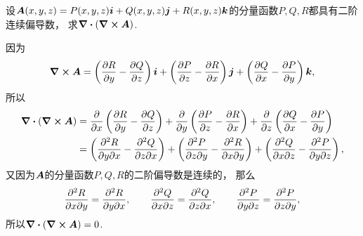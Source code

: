 \begin{example}
设\(\boldsymbol{A}(x,y,z) = P(x,y,z) \boldsymbol{i} + Q(x,y,z) \boldsymbol{j} + R(x,y,z) \boldsymbol{k}\)的分量函数\(P,Q,R\)都具有二阶连续偏导数，
求\(\div(\curl \boldsymbol{A})\).
\begin{solution}
因为\begin{equation*}
	\curl \boldsymbol{A}
	= \left( \pdv{R}{y} - \pdv{Q}{z} \right) \boldsymbol{i}
	+ \left( \pdv{P}{z} - \pdv{R}{x} \right) \boldsymbol{j}
	+ \left( \pdv{Q}{x} - \pdv{P}{y} \right) \boldsymbol{k},
\end{equation*}
所以\begin{align*}
	\div(\curl \boldsymbol{A})
	&= \pdv{x} \left( \pdv{R}{y} - \pdv{Q}{z} \right)
	+ \pdv{y} \left( \pdv{P}{z} - \pdv{R}{x} \right)
	+ \pdv{z} \left( \pdv{Q}{x} - \pdv{P}{y} \right) \\
	&= \left( \pdv[2]{R}{y}{x} - \pdv[2]{Q}{z}{x} \right)
	+ \left( \pdv[2]{P}{z}{y} - \pdv[2]{R}{x}{y} \right)
	+ \left( \pdv[2]{Q}{x}{z} - \pdv[2]{P}{y}{z} \right),
\end{align*}
又因为\(\boldsymbol{A}\)的分量函数\(P,Q,R\)的二阶偏导数是连续的，
那么\begin{equation*}
	\pdv[2]{R}{x}{y} = \pdv[2]{R}{y}{x},
	\qquad
	\pdv[2]{Q}{x}{z} = \pdv[2]{Q}{z}{x},
	\qquad
	\pdv[2]{P}{y}{z} = \pdv[2]{P}{z}{y},
\end{equation*}
所以\(\div(\curl \boldsymbol{A}) = 0\).
\end{solution}
\end{example}
